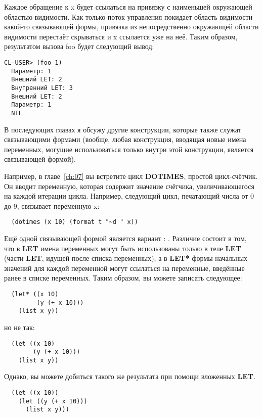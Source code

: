 Каждое обращение к x будет ссылаться на привязку с наименьшей окружающей областью
видимости. Как только поток управления покидает область видимости какой-то связывающей
формы, привязка из непосредственно окружающей области видимости перестаёт скрываться и x
ссылается уже на неё. Таким образом, результатом вызова foo будет следующий вывод:

\begin{lstlisting}[style=lisprepl]
  CL-USER> (foo 1)
  Параметр: 1
  Внешний LET: 2
  Внутренний LET: 3
  Внешний LET: 2
  Параметр: 1
  NIL
\end{lstlisting}

В последующих главах я обсужу другие конструкции, которые также служат связывающими
формами (вообще, любая конструкция, вводящая новые имена переменных, могущие
использоваться только внутри этой конструкции, является связывающей формой).

Например, в главе~\ref{ch:07} вы встретите цикл \textbf{DOTIMES}, простой цикл-счётчик. Он
вводит переменную, которая содержит значение счётчика, увеличивающегося на каждой итерации
цикла. Например, следующий цикл, печатающий числа от 0 до 9, связывает переменную x:

\begin{lstlisting}
  (dotimes (x 10) (format t "~d " x))
\end{lstlisting}

Ещё одной связывающей формой является вариант : \textbf{}. Различие
состоит в том, что в \textbf{LET} имена переменных могут быть использованы только в теле
\textbf{LET} (части \textbf{LET}, идущей после списка переменных), а в \textbf{LET* }формы
начальных значений для каждой переменной могут ссылаться на переменные, введённые ранее в
списке переменных. Таким образом, вы можете записать следующее:

\begin{lstlisting}
  (let* ((x 10)
         (y (+ x 10)))
    (list x y))
\end{lstlisting}

но не так:

\begin{lstlisting}
  (let ((x 10)
        (y (+ x 10)))
    (list x y))
\end{lstlisting}

Однако, вы можете добиться такого же результата при помощи вложенных \textbf{LET}.

\begin{lstlisting}
  (let ((x 10))
    (let ((y (+ x 10)))
      (list x y)))
\end{lstlisting}

